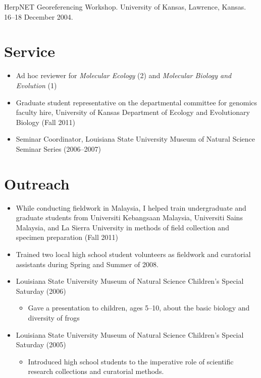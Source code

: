 \documentclass[10pt]{article}
\newenvironment{myItemize}{
  \begin{itemize}
    \setlength{\leftskip}{-4mm}
    \setlength{\itemsep}{0.25em}
    \setlength{\parskip}{0pt}
    \setlength{\parsep}{0.5em}}
  {\end{itemize}}
\newcommand{\myHangIndent}{\hangindent=5mm}
\begin{document}
\myHangIndent
HerpNET Georeferencing Workshop.
University of Kansas, Lawrence, Kansas.
16--18 December 2004.

\section*{Service}
\begin{myItemize}
\item Ad hoc reviewer for \emph{Molecular Ecology} (2) and \emph{Molecular Biology and Evolution} (1)
\item Graduate student representative on the departmental committee for genomics faculty hire, University of Kansas Department of Ecology and Evolutionary Biology (Fall 2011)
\item Seminar Coordinator, Louisiana State University Museum of Natural Science Seminar Series (2006--2007)
\end{myItemize}

\section*{Outreach}
\begin{myItemize}
\item While conducting fieldwork in Malaysia, I helped train undergraduate and graduate students from Universiti Kebangsaan Malaysia, Universiti Sains Malaysia, and La Sierra University in methods of field collection and specimen preparation (Fall 2011)
\item Trained two local high school student volunteers as fieldwork and curatorial assistants during Spring and Summer of 2008.
\item Louisiana State University Museum of Natural Science Children’s Special Saturday (2006)
	\begin{myItemize}
	\item Gave a presentation to children, ages 5--10, about the basic biology and diversity of frogs
	\end{myItemize}
\item Louisiana State University Museum of Natural Science Children’s Special Saturday (2005)
	\begin{myItemize}
	\item Introduced high school students to the imperative role of scientific research collections and curatorial methods.
	\end{myItemize}
\end{myItemize}
\end{document}
